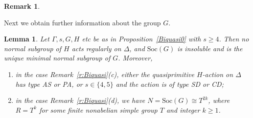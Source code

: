 \documentclass[11pt]{amsart}
\newtheorem{lemma}[theorem]{Lemma}
\newtheorem{remark}[theorem]{Remark}
\newcommand{\Soc}{\mathrm{Soc}}
\newcommand{\Diag}{\mathrm{Diag}}
\begin{document}
\begin{remark}
{\begin{enumerate}
\end{enumerate}
}
\end{remark}    

Next we obtain further information about the group $G$.

\begin{lemma}\label{l:i-or-iia}
Let $\Gamma, s, G, H$ etc be as in Proposition~\ref{Biquasi0} with $s\geqslant4$. Then no normal subgroup of $H$ acts regularly on $\Delta$, and $\Soc(G)$ is insoluble and is the unique minimal normal subgroup of $G$.
Moreover,
\begin{enumerate}
    \item[(a)] in the case Remark~\ref{r:Biquasi}(c),  either the quasiprimitive $H$-action on $\Delta$ has type AS or PA, or $s\in\{4,5\}$ and the action is of type SD or CD;
    \item[(b)] in the case Remark~\ref{r:Biquasi}(d), we have  $N=\Soc(G)\cong T^{2k}$, where $R=T^k$ for some finite nonabelian simple group $T$ and integer $k\geqslant1$.
\end{enumerate} 
\end{lemma}

\end{document}
